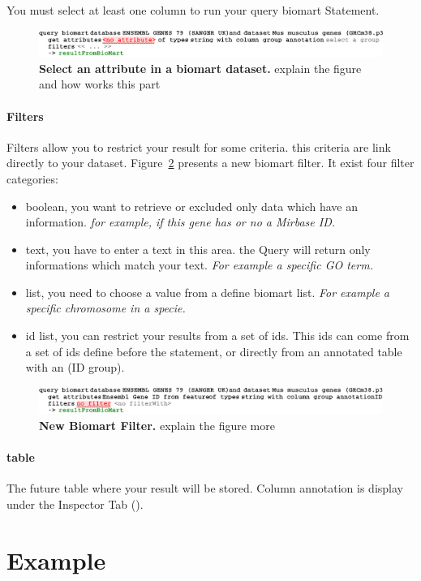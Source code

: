 \begin{remark}
You must select at least one column to run your query biomart Statement.
\end{remark}

 \begin{figure}[h!tbp]
  \centering
  \includegraphics[width=\figWidthWide]{figures/BiomartAttribute.pdf}
\caption[Select an attribute in a biomart dataset.]{\textbf{Select an attribute in a biomart dataset.} explain the figure and how works this part}
\label{fig:attributeBiomart}
\end{figure}
\paragraph{Filters}
Filters allow you to restrict your result for some criteria. this criteria are link directly to your dataset. Figure~\ref{fig:BiomartFilter} presents a new biomart filter. It exist four filter categories: 
\begin{itemize}
\item boolean, you want to retrieve or excluded only data which have an information. \textit{for example, if this gene has or no a Mirbase ID.}
\item text, you have to enter a text in this area. the Query will return only informations which match your text. \textit{For example  a specific GO term.}
\item list,  you need to choose a value from a define biomart list. \textit{For example a specific chromosome in a specie.}
\item id list, you can restrict your results from a set of ids. This ids can come from a set of ids define before the statement, or directly from an annotated table with an (ID group).  
\end{itemize}

 \begin{figure}[h!tbp]
  \centering
  \includegraphics[width=\figWidthWide]{figures/BiomartFilter.pdf}
\caption[New Biomart Filter]{\textbf{New Biomart Filter.} explain the figure more}
\label{fig:BiomartFilter}
\end{figure}

\paragraph{table}
The future table where your result will be stored. Column annotation is display under the Inspector Tab (\inspectorTabIcon).
\section{Example}
